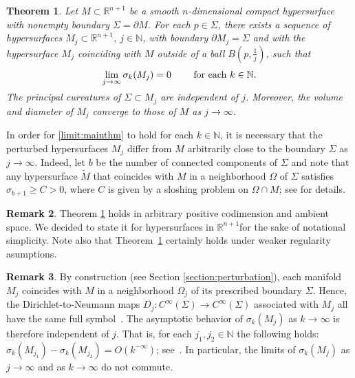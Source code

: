 \documentclass{CUP-JNL-FMP}%
\newtheorem{theorem}{Theorem}[section]
\theoremstyle{definition}
\newtheorem{remark}[theorem]{Remark}
\numberwithin{equation}{section}
\begin{document}
\begin{theorem}\label{thm:main}
Let $M \subset \mathbb{R}^{n+1}$ be a smooth $n$-dimensional compact hypersurface with nonempty boundary $\Sigma=\partial M$. For each $p \in \Sigma$, there exists a sequence of hypersurfaces $M_j\subset\mathbb{R}^{n+1}$, $j\in\mathbb{N}$, with boundary $\partial M_j=\Sigma$
and with the hypersurface $M_j$ coinciding with $M$ outside of a ball $B(p, \frac{1}{j})$,
such that\vspace*{-2pt}%
\begin{gather}\label{limit:mainthm}
\lim_{j\to\infty}\sigma_k(M_j)=0\qquad\mbox{ for each }k\in\mathbb{N}.
\vspace*{-2pt}%
\end{gather}
The principal curvatures of $\Sigma\subset M_j$ are independent of $j$. Moreover,
the volume and diameter of $M_j$ converge to those of $M$ as $j\to\infty$.
\end{theorem}

In order for \eqref{limit:mainthm} to hold for each $k\in\mathbb{N}$, it is necessary that the perturbed hypersurfaces $M_j$ differ from $M$ arbitrarily close to the boundary $\Sigma$ as $j\to\infty$. Indeed, let $b$ be the number of connected components of $\Sigma$ and note that any hypersurface $\widetilde{M}$ that coincides with $M$ in a neighborhood $\Omega$ of $\Sigma$ satisfies
$\sigma_{b+1}\geq C>0$, where $C$ is given by a sloshing problem on $\Omega\cap M$; see \cite{CGG17} for details.

\begin{remark}\label{remark:regularitycodim}
 Theorem \ref{thm:main} holds in arbitrary positive codimension and ambient space. We decided to state it for hypersurfaces in $\mathbb{R}^{n+1}$for the sake of notational simplicity. Note also that Theorem~\ref{thm:main} certainly holds under weaker regularity asumptions.
\end{remark}

\begin{remark}\label{remark:noncommutative}
By construction (see Section \ref{section:perturbation}), each manifold $M_j$ coincides with $M$ in a neighborhood $\Omega_j$ of its prescribed boundary $\Sigma$.
  Hence, the Dirichlet-to-Neumann maps $D_j\colon C^\infty(\Sigma)\rightarrow C^\infty(\Sigma)$ associated with $M_j$ all have the same full symbol~\cite{LeeUhlmann}.
  The asymptotic behavior of $\sigma_k(M_j)$ as $k\to\infty$ is therefore independent of $j$. That is, for each $j_1, j_2\in\mathbb{N}$ the following holds:
    $\sigma_k(M_{j_1})-\sigma_k(M_{j_2})=O(k^{-\infty})$; see~\cite[Lemma 2.1]{GPPS}. In particular, the limits of $\sigma_k(M_j)$ as $j\to\infty$ and as $k\to\infty$ do not commute.
\end{remark}
\end{document}
